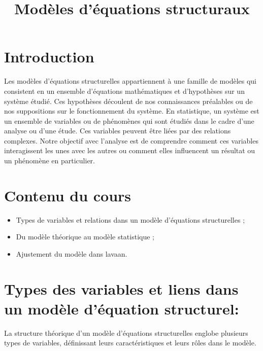 \documentclass[
]{article}
\title{Modèles d'équations structuraux}
\author{}
\date{\vspace{-2.5em}}
\begin{document}
\maketitle

{
\setcounter{tocdepth}{2}
\tableofcontents
}
\hypertarget{introduction}{%
\section{Introduction}\label{introduction}}

Les modèles d'équations structurelles appartiennent à une famille de
modèles qui consistent en un ensemble d'équations mathématiques et
d'hypothèses sur un système étudié. Ces hypothèses découlent de nos
connaissances préalables ou de nos suppositions sur le fonctionnement du
système. En statistique, un système est un ensemble de variables ou de
phénomènes qui sont étudiés dans le cadre d'une analyse ou d'une étude.
Ces variables peuvent être liées par des relations complexes. Notre
objectif avec l'analyse est de comprendre comment ces variables
interagissent les unes avec les autres ou comment elles influencent un
résultat ou un phénomène en particulier.

\hypertarget{contenu-du-cours}{%
\section{Contenu du cours}\label{contenu-du-cours}}

\begin{itemize}
\item
  Types de variables et relations dans un modèle d'équations
  structurelles ;
\item
  Du modèle théorique au modèle statistique ;
\item
  Ajustement du modèle dans lavaan.
\end{itemize}

\hypertarget{types-des-variables-et-liens-dans-un-moduxe8le-duxe9quation-structurel}{%
\section{Types des variables et liens dans un modèle d'équation
structurel:}\label{types-des-variables-et-liens-dans-un-moduxe8le-duxe9quation-structurel}}

La structure théorique d'un modèle d'équations structurelles englobe
plusieurs types de variables, définissant leurs caractéristiques et
leurs rôles dans le modèle.
\end{document}
